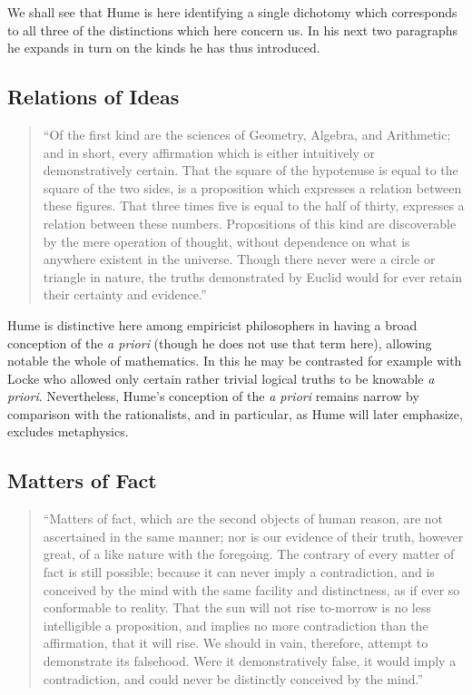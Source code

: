 We shall see that Hume is here identifying a single dichotomy which
corresponds to all three of the distinctions which here concern us.
In his next two paragraphs he expands in turn on the kinds he has thus
introduced.

\subsection{Relations of Ideas}

\begin{quote}
``Of the first kind are the sciences of Geometry, Algebra, and
Arithmetic; and in short, every affirmation which is either
intuitively or demonstratively certain.
That the square of the hypotenuse is equal to the square of the two
sides, is a proposition which expresses a relation between these
figures.
That three times five is equal to the half of thirty, expresses a
relation between these numbers.
Propositions of this kind are discoverable by the mere operation of
thought, without dependence on what is anywhere existent in the
universe.
Though there never were a circle or triangle in nature, the truths
demonstrated by Euclid would for ever retain their certainty and
evidence.''
\end{quote}

Hume is distinctive here among empiricist philosophers in having a
broad conception of the \emph{a priori} (though he does not use that
term here), allowing notable the whole of mathematics.
In this he may be contrasted for example with Locke who allowed
only certain rather trivial logical truths to be knowable \emph{a
  priori}.
Nevertheless, Hume's conception of the \emph{a priori} remains narrow
by comparison with the rationalists, and in particular, as Hume will
later emphasize, excludes metaphysics.

\subsection{Matters of Fact}

\begin{quote}
``Matters of fact, which are the second objects of human reason, are not ascertained in the same manner; nor is our evidence of their truth, however great, of a like nature with the foregoing. The contrary of every matter of fact is still possible; because it can never imply a contradiction, and is conceived by the mind with the same facility and distinctness, as if ever so conformable to reality. That the sun will not rise to-morrow is no less intelligible a proposition, and implies no more contradiction than the affirmation, that it will rise. We should in vain, therefore, attempt to demonstrate its falsehood. Were it demonstratively false, it would imply a contradiction, and could never be distinctly conceived by the mind.''
\end{quote}

